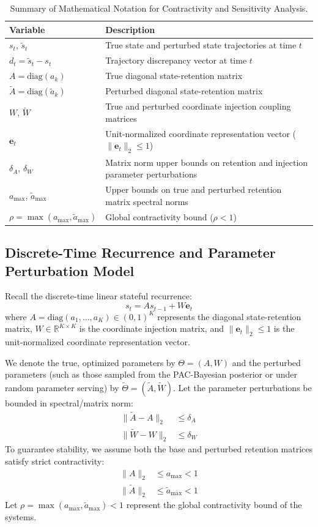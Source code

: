 \begin{table}[tb]
\centering
\caption{Summary of Mathematical Notation for Contractivity and Sensitivity Analysis.}
\label{tab:notation_summary}
\vskip 0.1in
\begin{tabular}{ll}
\toprule
Variable & Description \\
\midrule
$s_t$, $\tilde{s}_t$ & True state and perturbed state trajectories at time $t$ \\
$d_t = \tilde{s}_t - s_t$ & Trajectory discrepancy vector at time $t$ \\
$A = \text{diag}(a_k)$ & True diagonal state-retention matrix \\
$\tilde{A} = \text{diag}(\tilde{a}_k)$ & Perturbed diagonal state-retention matrix \\
$W$, $\tilde{W}$ & True and perturbed coordinate injection coupling matrices \\
$\mathbf{e}_t$ & Unit-normalized coordinate representation vector ($\|\mathbf{e}_t\|_2 \le 1$) \\
$\delta_A$, $\delta_W$ & Matrix norm upper bounds on retention and injection parameter perturbations \\
$a_{\max}$, $\tilde{a}_{\max}$ & Upper bounds on true and perturbed retention matrix spectral norms \\
$\rho = \max(a_{\max}, \tilde{a}_{\max})$ & Global contractivity bound ($\rho < 1$) \\
\bottomrule
\end{tabular}
\end{table}

\subsection{Discrete-Time Recurrence and Parameter Perturbation Model}
Recall the discrete-time linear stateful recurrence:
\begin{equation}
    s_t = A s_{t-1} + W \mathbf{e}_t
\end{equation}
where $A = \text{diag}(a_1, \dots, a_K) \in (0, 1)^K$ represents the diagonal state-retention matrix, $W \in \mathbb{R}^{K \times K}$ is the coordinate injection matrix, and $\|\mathbf{e}_t\|_2 \le 1$ is the unit-normalized coordinate representation vector.

We denote the true, optimized parameters by $\Theta = (A, W)$ and the perturbed parameters (such as those sampled from the PAC-Bayesian posterior or under random parameter serving) by $\tilde{\Theta} = (\tilde{A}, \tilde{W})$. Let the parameter perturbations be bounded in spectral/matrix norm:
\begin{align}
    \|\tilde{A} - A\|_2 &\le \delta_A \\
    \|\tilde{W} - W\|_2 &\le \delta_W
\end{align}
To guarantee stability, we assume both the base and perturbed retention matrices satisfy strict contractivity:
\begin{align}
    \|A\|_2 &\le a_{\max} < 1 \\
    \|\tilde{A}\|_2 &\le \tilde{a}_{\max} < 1
\end{align}
Let $\rho = \max(a_{\max}, \tilde{a}_{\max}) < 1$ represent the global contractivity bound of the systems.

